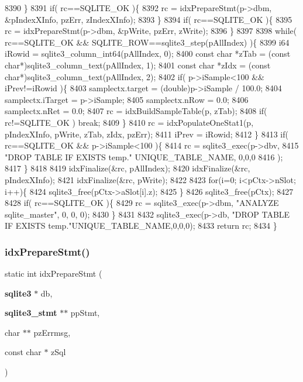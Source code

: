 \begin{DoxyCode}
8390   \}
8391   \textcolor{keywordflow}{if}( rc==SQLITE_OK )\{
8392     rc = idxPrepareStmt(p->dbm, &pIndexXInfo, pzErr, zIndexXInfo);
8393   \}
8394   \textcolor{keywordflow}{if}( rc==SQLITE_OK )\{
8395     rc = idxPrepareStmt(p->dbm, &pWrite, pzErr, zWrite);
8396   \}
8397 
8398   \textcolor{keywordflow}{while}( rc==SQLITE_OK && SQLITE_ROW==sqlite3_step(pAllIndex) )\{
8399     i64 iRowid = sqlite3_column_int64(pAllIndex, 0);
8400     \textcolor{keyword}{const} \textcolor{keywordtype}{char} *zTab = (\textcolor{keyword}{const} \textcolor{keywordtype}{char}*)sqlite3_column_text(pAllIndex, 1);
8401     \textcolor{keyword}{const} \textcolor{keywordtype}{char} *zIdx = (\textcolor{keyword}{const} \textcolor{keywordtype}{char}*)sqlite3_column_text(pAllIndex, 2);
8402     \textcolor{keywordflow}{if}( p->iSample<100 && iPrev!=iRowid )\{
8403       samplectx.target = (double)p->iSample / 100.0;
8404       samplectx.iTarget = p->iSample;
8405       samplectx.nRow = 0.0;
8406       samplectx.nRet = 0.0;
8407       rc = idxBuildSampleTable(p, zTab);
8408       \textcolor{keywordflow}{if}( rc!=SQLITE_OK ) \textcolor{keywordflow}{break};
8409     \}
8410     rc = idxPopulateOneStat1(p, pIndexXInfo, pWrite, zTab, zIdx, pzErr);
8411     iPrev = iRowid;
8412   \}
8413   \textcolor{keywordflow}{if}( rc==SQLITE_OK && p->iSample<100 )\{
8414     rc = sqlite3_exec(p->dbv, 
8415         \textcolor{stringliteral}{"DROP TABLE IF EXISTS temp."} UNIQUE_TABLE_NAME, 0,0,0
8416     );
8417   \}
8418 
8419   idxFinalize(&rc, pAllIndex);
8420   idxFinalize(&rc, pIndexXInfo);
8421   idxFinalize(&rc, pWrite);
8422 
8423   \textcolor{keywordflow}{for}(i=0; i<pCtx->nSlot; i++)\{
8424     sqlite3_free(pCtx->aSlot[i].z);
8425   \}
8426   sqlite3_free(pCtx);
8427 
8428   \textcolor{keywordflow}{if}( rc==SQLITE_OK )\{
8429     rc = sqlite3_exec(p->dbm, \textcolor{stringliteral}{"ANALYZE sqlite\_master"}, 0, 0, 0);
8430   \}
8431 
8432   sqlite3_exec(p->db, \textcolor{stringliteral}{"DROP TABLE IF EXISTS temp."}UNIQUE_TABLE_NAME,0,0,0);
8433   \textcolor{keywordflow}{return} rc;
8434 \}
\end{DoxyCode}
\mbox{\label{shell_8c_a4ad790c8d14edc02a89d00fc44e64391}} 
\subsubsection{idx\+Prepare\+Stmt()}
{\footnotesize\ttfamily static int idx\+Prepare\+Stmt (\begin{DoxyParamCaption}\item[{\textbf{ sqlite3} $\ast$}]{db,  }\item[{\textbf{ sqlite3\+\_\+stmt} $\ast$$\ast$}]{pp\+Stmt,  }\item[{char $\ast$$\ast$}]{pz\+Errmsg,  }\item[{const char $\ast$}]{z\+Sql }\end{DoxyParamCaption})\hspace{0.3cm}{\ttfamily [static]}}




